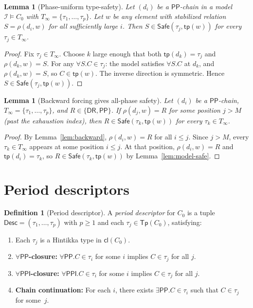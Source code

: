 \documentclass[a4paper,11pt]{article}
\newtheorem{lemma}[theorem]{Lemma}
\theoremstyle{definition}
\newtheorem{definition}[theorem]{Definition}
\newcommand{\DR}{\ensuremath{\mathsf{DR}}}
\newcommand{\PP}{\ensuremath{\mathsf{PP}}}
\newcommand{\PPI}{\ensuremath{\mathsf{PPI}}}
\newcommand{\cl}{\ensuremath{\mathsf{cl}}}
\newcommand{\tp}{\ensuremath{\mathsf{tp}}}
\newcommand{\Tp}{\ensuremath{\mathsf{Tp}}}
\newcommand{\Desc}{\ensuremath{\mathsf{Desc}}}
\newcommand{\Safe}{\ensuremath{\mathsf{Safe}}}
\newcommand{\interp}{\ensuremath{\mathcal{I}}}
\begin{document}
\begin{lemma}[Phase-uniform type-safety]\label{lem:phase-uniform}
Let $(d_i)$ be a $\PP$-chain in a model $\interp \models C_0$
with $T_\infty = \{\tau_1, \ldots, \tau_p\}$.  Let $w$ be any
element with stabilized relation $S = \rho(d_i, w)$ for all
sufficiently large $i$.  Then
$S \in \Safe(\tau_j, \tp(w))$ for every $\tau_j \in T_\infty$.
\end{lemma}

\begin{proof}
Fix $\tau_j \in T_\infty$.  Choose $k$ large enough that both
$\tp(d_k) = \tau_j$ and $\rho(d_k, w) = S$.  For any
$\forall S.C \in \tau_j$: the model satisfies $\forall S.C$ at $d_k$,
and $\rho(d_k, w) = S$, so $C \in \tp(w)$.  The inverse direction
is symmetric.  Hence $S \in \Safe(\tau_j, \tp(w))$.
\end{proof}

\begin{lemma}[Backward forcing gives all-phase safety]
\label{lem:backward-safe}
Let $(d_i)$ be a $\PP$-chain, $T_\infty = \{\tau_1, \ldots, \tau_p\}$,
and $R \in \{\DR, \PP\}$.  If $\rho(d_j, w) = R$ for some position
$j > M$ (past the exhaustion index), then
$R \in \Safe(\tau_k, \tp(w))$ for every $\tau_k \in T_\infty$.
\end{lemma}

\begin{proof}
By Lemma~\ref{lem:backward}, $\rho(d_i, w) = R$ for all $i \le j$.
Since $j > M$, every $\tau_k \in T_\infty$ appears at some position
$i \le j$.  At that position, $\rho(d_i, w) = R$ and
$\tp(d_i) = \tau_k$, so $R \in \Safe(\tau_k, \tp(w))$ by
Lemma~\ref{lem:model-safe}.
\end{proof}


\section{Period descriptors}\label{sec:period}

\begin{definition}[Period descriptor]\label{def:period-descriptor}
A \emph{period descriptor} for $C_0$ is a tuple
$\Desc = (\tau_1, \ldots, \tau_p)$ with $p \ge 1$ and each
$\tau_j \in \Tp(C_0)$, satisfying:
\begin{enumerate}[label=(V\arabic*)]
\item Each $\tau_j$ is a Hintikka type in $\cl(C_0)$.
\item \textbf{$\forall\PP$-closure:} $\forall\PP.C \in \tau_i$
  for some $i$ implies $C \in \tau_j$ for all $j$.
\item \textbf{$\forall\PPI$-closure:} $\forall\PPI.C \in \tau_i$
  for some $i$ implies $C \in \tau_j$ for all $j$.
\item \textbf{Chain continuation:} For each $i$, there exists
  $\exists\PP.C \in \tau_i$ such that $C \in \tau_j$ for some~$j$.
\end{enumerate}
\end{definition}
\end{document}
